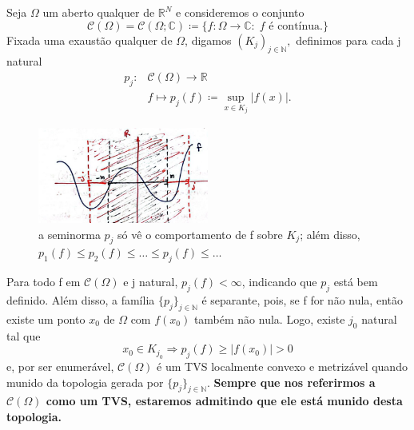 \documentclass[../distribution_theory_notes.tex]{subfiles}
\begin{document}
\begin{example}
	Seja \(\Omega \) um aberto qualquer de \(\mathbb{R}^{N}\) e consideremos o conjunto
	\[
		\mathcal{C}(\Omega )=\mathcal{C}(\Omega ; \mathbb{C})\coloneqq \{f:\Omega \rightarrow \mathbb{C}:\; f\text{ é contínua.}\}
	\]
	Fixada uma exaustão qualquer de \(\Omega \), digamos \((K_{j})_{j\in \mathbb{N}},\) definimos para cada j natural
	\begin{align*}
		p_{j}: & \mathcal{C}(\Omega )\rightarrow \mathbb{R}          \\
		       & f\mapsto p_{j}(f)\coloneqq \sup_{x\in K_{j}}|f(x)|.
	\end{align*}
	\begin{figure}[H]
		\begin{center}
			\includegraphics[height=0.5\textheight, width=0.5\textwidth, keepaspectratio]{./Images/continuous_space_seminorm_04.png}
		\end{center}
		\caption{a seminorma \(p_{j}\) só vê o comportamento de f sobre \(K_{j}\); além disso, \(p_1(f)\leq p_2(f)\leq \dotsc \leq p_{j}(f)\leq \dotsc \)}
	\end{figure}

	Para todo f em \(\mathcal{C}(\Omega )\) e j natural, \(p_{j}(f) < \infty\), indicando que \(p_{j}\) está bem definido. Além disso, a família \(\{p_{j}\}_{j\in \mathbb{N}}\) é separante, pois, se f for não nula, então existe um ponto \(x_{0}\) de \(\Omega \) com \(f(x_{0})\) também não nula. Logo, existe \(j_{0}\) natural tal que
	\[
		x_{0}\in K_{j_{0}} \Rightarrow p_{j}(f)\geq |f(x_{0})|>0
	\]
	e, por ser enumerável, \(\mathcal{C}(\Omega )\) é um TVS localmente convexo e metrizável quando munido da topologia gerada por \(\{p_{j}\}_{j\in \mathbb{N}}\). \textbf{Sempre que nos referirmos a \(\mathcal{C}(\Omega )\) como um TVS, estaremos admitindo que ele está munido desta topologia.}


\end{example}
\end{document}
